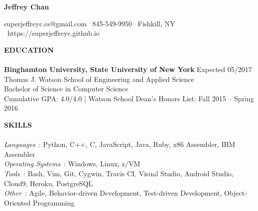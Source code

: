\documentclass[10.5pt]{res}
\newcommand{\sectionSpace}{\vspace{-3pt}}
\begin{document}
 
\centerline{\LARGE \textbf{Jeffrey Chan}}
{\vspace{1pt}}
\centerline{superjeffreyc.cs@gmail.com \textbar ~845-549-9950 \textbar ~Fishkill, NY \textbar ~https://superjeffreyc.github.io}      
\vspace{-16pt}              
\begin{resume}                   
\textbf{EDUCATION} \\ [-10.5pt]
\noindent\makebox[\linewidth]{\rule{\textwidth}{0.4pt}}\\
\textbf{Binghamton University, State University of New York} \hfill Expected 05/2017 \\
    	Thomas J. Watson School of Engineering and Applied Science \\
	Bachelor of Science in Computer Science \\
	Cumulative GPA: 4.0/4.0 | Watson School Dean’s Honors List: Fall 2015 – Spring 2016 
	\sectionSpace

\textbf{SKILLS} \\ [-10.5pt]
\noindent\makebox[\linewidth]{\rule{\textwidth}{0.4pt}}\\
{\it Languages}~: Python, C++, C, JavaScript, Java, Ruby, x86 Assembler, IBM Assembler \\
{\it Operating Systems}~: Windows, Linux, z/VM \\
{\it Tools}~: Bash, Vim, Git, Cygwin, Travis CI, Visual Studio, Android Studio, Cloud9, Heroku, PostgreSQL \\
{\it Other}~: Agile, Behavior-driven Development, Test-driven Development, Object-Oriented Programming
\sectionSpace


\end{resume}
\end{document}
